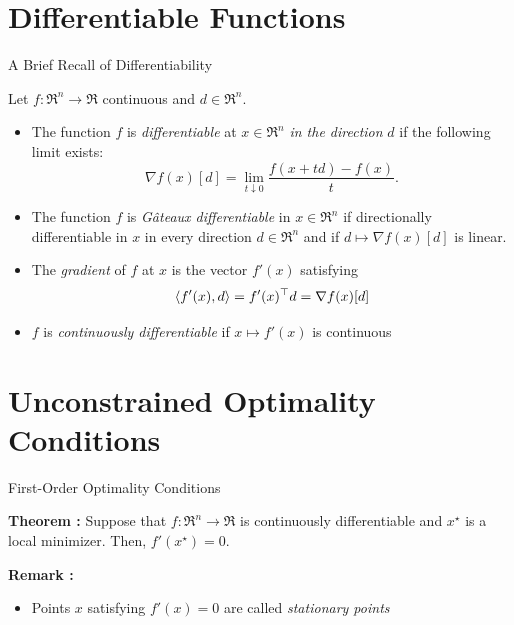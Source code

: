 \documentclass[9pt]{beamer}
\begin{document}
\section{Differentiable Functions}

\begin{frame}{A Brief Recall of Differentiability}


  Let $f:\Re^n\to\Re$ continuous and $d\in \Re^n$.

  \begin{itemize}
    \setlength\itemsep{2em}
  \item The function $f$ is \emph{differentiable} at $x \in \Re^n$ \emph{in the direction} $d$ if the following limit exists:
    \[
      \nabla f(x)[d] = \lim_{t\downarrow 0} \frac{f(x+t d)-f(x)}{t}.
    \]
  \item<2-> The function $f$ is \emph{G\^ateaux differentiable} in $x \in \Re^n$ if directionally differentiable in $x$ in every direction $d \in \Re^n$ and if $d\mapsto \nabla f(x)[d]$ is linear.

  \item<3-> The \emph{gradient} of $f$ at $x$ is the vector $f'(x)$ satisfying $$\left<f'(x), d\right>=f'(x)^\top d=\nabla f(x)[d]$$
  \item<4-> $f$ is \emph{continuously differentiable} if $x \mapsto f'(x)$ is continuous
  \end{itemize}
  
  
\end{frame}

\section{Unconstrained Optimality Conditions}

\begin{frame}{First-Order Optimality Conditions}

  
  \textbf{Theorem : } Suppose that $f:\Re^n\to\Re$ is continuously differentiable and $x^\star$ is a local minimizer. Then, $f'(x^\star) = 0$.

  \vfill

  \textbf{Remark : }

  \begin{itemize}
  \item Points $x$ satisfying $f'(x)=0$ are called \emph{stationary points}
  \end{itemize}

\end{frame}
\end{document}
